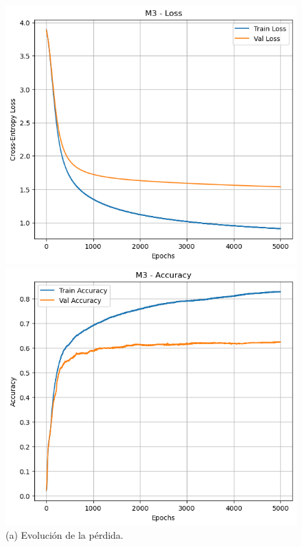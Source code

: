 \documentclass[11pt]{article}
\begin{document}
\begin{figure}[H]
    \centering
    \begin{minipage}[t]{0.32\textwidth}
        \centering
        \includegraphics[width=\linewidth]{figures/loss_m3.png}
        \caption*{(a) Evolución de la pérdida.}
    \end{minipage}
    \hfill
    \begin{minipage}[t]{0.32\textwidth}
        \centering
        \includegraphics[width=\linewidth]{figures/acc_m3.png}

\end{minipage}
\end{figure}
\end{document}
